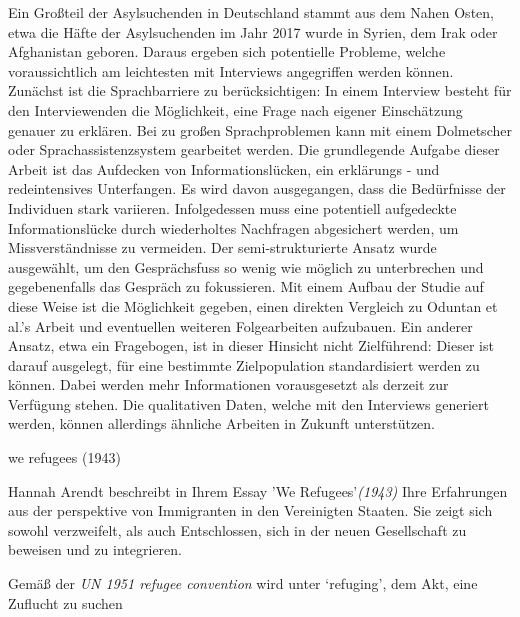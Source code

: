 Ein Gro\ss{}teil der Asylsuchenden in Deutschland stammt aus dem Nahen Osten, etwa die H\"afte der Asylsuchenden im Jahr 2017 wurde in Syrien, dem Irak oder Afghanistan geboren\cite{asylum2017seekers}. Daraus ergeben sich potentielle Probleme, welche voraussichtlich am leichtesten mit Interviews angegriffen werden k\"onnen.
Zun\"achst ist die Sprachbarriere zu ber\"ucksichtigen: In einem Interview besteht f\"ur den Interviewenden die M\"oglichkeit, eine Frage nach eigener Einsch\"atzung genauer zu erkl\"aren. Bei zu gro\ss{}en Sprachproblemen kann mit einem Dolmetscher oder Sprachassistenzsystem gearbeitet werden.\newline
Die grundlegende Aufgabe dieser Arbeit ist das Aufdecken von Informationsl\"ucken, ein erkl\"arungs - und redeintensives Unterfangen. Es wird davon ausgegangen, dass die Bed\"urfnisse der Individuen stark variieren. Infolgedessen muss eine potentiell aufgedeckte Informationsl\"ucke durch wiederholtes Nachfragen abgesichert werden, um Missverst\"andnisse zu vermeiden.\newline
Der semi-strukturierte Ansatz wurde ausgew\"ahlt, um den Gespr\"achsfuss so wenig wie m\"oglich zu unterbrechen und gegebenenfalls das Gespr\"ach zu fokussieren.\newline
Mit einem Aufbau der Studie auf diese Weise ist die M\"oglichkeit gegeben, einen direkten Vergleich zu Oduntan et al.'s Arbeit und eventuellen weiteren Folgearbeiten aufzubauen.\newline
Ein anderer Ansatz, etwa ein Fragebogen, ist in dieser Hinsicht nicht Zielf\"uhrend: Dieser ist darauf ausgelegt, f\"ur eine bestimmte Zielpopulation standardisiert werden zu k\"onnen. Dabei werden mehr Informationen vorausgesetzt als derzeit zur Verf\"ugung stehen.\newline
Die qualitativen Daten, welche mit den Interviews generiert werden, k\"onnen allerdings \"ahnliche Arbeiten in Zukunft unterst\"utzen.\newline


we refugees (1943)

Hannah Arendt beschreibt in Ihrem Essay 'We Refugees'\textit{(1943)} Ihre Erfahrungen aus der perspektive von Immigranten in den Vereinigten Staaten. Sie zeigt sich sowohl verzweifelt, als auch Entschlossen, sich in der neuen Gesellschaft zu beweisen und zu integrieren.\newline



Gemäß der \textit{UN 1951 refugee convention} wird unter `refuging', dem Akt, eine Zuflucht zu suchen


